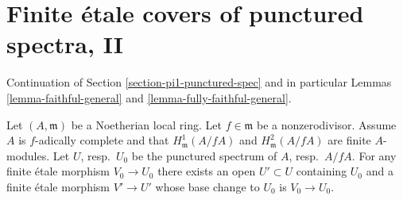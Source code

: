 
















\section{Finite \'etale covers of punctured spectra, II}
\label{section-pi1-punctured-spec-II}

\noindent
Continuation of Section \ref{section-pi1-punctured-spec} and in particular
Lemmas \ref{lemma-faithful-general} and \ref{lemma-fully-faithful-general}.

\begin{lemma}
\label{lemma-essentially-surjective-general}
Let $(A, \mathfrak m)$ be a Noetherian local ring. Let $f \in \mathfrak m$ be a
nonzerodivisor. Assume $A$ is $f$-adically complete and that
$H^1_\mathfrak m(A/fA)$ and $H^2_\mathfrak m(A/fA)$
are finite $A$-modules. Let $U$, resp.\ $U_0$ be the punctured spectrum of
$A$, resp.\ $A/fA$. For any finite \'etale morphism $V_0 \to U_0$ there
exists an open $U' \subset U$ containing $U_0$ and a finite \'etale morphism
$V' \to U'$ whose base change to $U_0$ is $V_0 \to U_0$.
\end{lemma}

